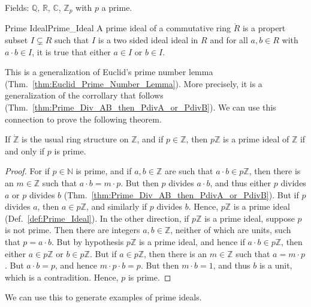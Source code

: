     \begin{example}
        Fields: $\mathbb{Q}$, $\mathbb{R}$, $\mathbb{C}$, $\mathbb{Z}_{p}$
        with $p$ a prime.
    \end{example}
    \begin{fdefinition}{Prime Ideal}{Prime_Ideal}
        A prime ideal of a commutative ring $\ring{R}$ is a propert subset
        $I\subsetneq{R}$ such that $I$ is a two sided ideal ideal in $R$
        and for all $a,b\in{R}$ with $a\cdot{b}\in{I}$, it is true that
        either $a\in{I}$ or $b\in{I}$.
    \end{fdefinition}
    This is a generalization of Euclid's prime number lemma
    (Thm.~\ref{thm:Euclid_Prime_Number_Lemma}). More precisely, it is a
    generalization of the corrollary that follows
    (Thm.~\ref{thm:Prime_Div_AB_then_PdivA_or_PdivB}). We can use this
    connection to prove the following theorem.
    \begin{theorem}
        \label{thm:Prime_Ideals_of_Z}%
        If $\ring{\mathbb{Z}}$ is the usual ring structure on $\mathbb{Z}$,
        and if $p\in\mathbb{Z}$, then $p\mathbb{Z}$ is a prime ideal of
        $\mathbb{Z}$ if and only if $p$ is prime.
    \end{theorem}
    \begin{proof}
        For if $p\in\mathbb{N}$ is prime, and if $a,b\in\mathbb{Z}$ are such
        that $a\cdot{b}\in{p}\mathbb{Z}$, then there is an $m\in\mathbb{Z}$
        such that $a\cdot{b}=m\cdot{p}$. But then $p$ divides $a\cdot{b}$,
        and thus either $p$ divides $a$ or $p$ divides $b$
        (Thm.~\ref{thm:Prime_Div_AB_then_PdivA_or_PdivB}). But if $p$
        divides $a$, then $a\in{p}\mathbb{Z}$, and similarly if $p$ divides
        $b$. Hence, $p\mathbb{Z}$ is a prime ideal
        (Def.~\ref{def:Prime_Ideal}). In the other direction, if
        $p\mathbb{Z}$ is a prime ideal, suppose $p$ is not prime. Then there
        are integers $a,b\in\mathbb{Z}$, neither of which are units, such
        that $p=a\cdot{b}$. But by hypothesis $p\mathbb{Z}$ is a prime
        ideal, and hence if $a\cdot{b}\in{p}\mathbb{Z}$, then either
        $a\in{p}\mathbb{Z}$ or $b\in{p}\mathbb{Z}$. But if
        $a\in{p}\mathbb{Z}$, then there is an $m\in\mathbb{Z}$ such that
        $a=m\cdot{p}$. But $a\cdot{b}=p$, and hence $m\cdot{p}\cdot{b}=p$.
        But then $m\cdot{b}=1$, and thus $b$ is a unit, which is a
        contradition. Hence, $p$ is prime.
    \end{proof}
    We can use this to generate examples of prime ideals.
